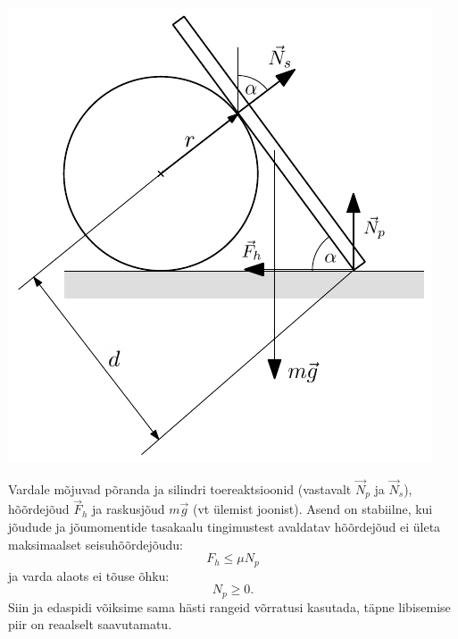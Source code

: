 \documentclass[11pt]{article}
\begin{document}
{{\ifSolution
\begin{center}
	\includegraphics[width=0.7\linewidth]{2008-v3g-09-lah1.pdf}
\end{center}

Vardale mõjuvad põranda ja silindri toereaktsioonid (vastavalt $\vec N_p$ ja $\vec N_s$), hõõrdejõud $\vec F_h$ ja raskusjõud $m\vec g$ (vt ülemist joonist). Asend on stabiilne, kui jõudude ja jõumomentide tasakaalu tingimustest avaldatav hõõrdejõud ei ületa maksimaalset seisuhõõrdejõudu:
\begin{equation} \label{2008-v3g-09:eq1}
F_{h} \leq \mu N_{p}
\end{equation}
ja varda alaots ei tõuse õhku:
\begin{equation} \label{2008-v3g-09:eq2}
N_p \geq 0.
\end{equation}
Siin ja edaspidi võiksime sama hästi rangeid võrratusi kasutada, täpne libisemise piir on reaalselt saavutamatu.

}}
\end{document}
